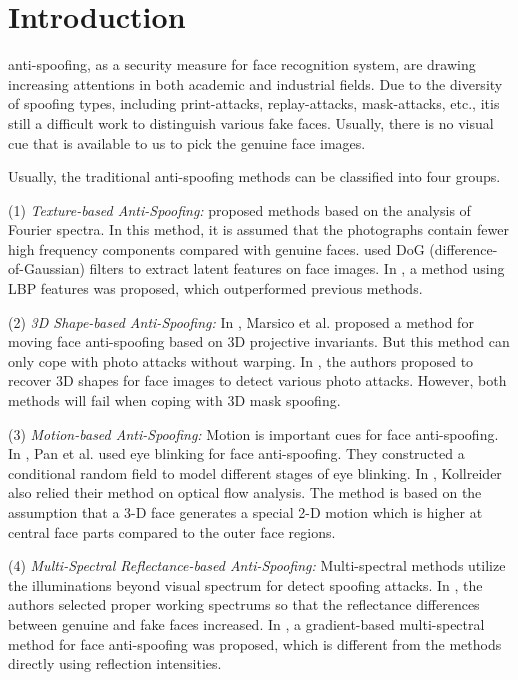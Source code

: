 \documentclass[journal]{IEEEtran}
\begin{document}
\section{Introduction}

 anti-spoofing, as a security measure for face recognition system, are drawing increasing attentions in both academic and industrial fields. Due to the diversity of spoofing types, including print-attacks, replay-attacks, mask-attacks, etc., itis still a difficult work to distinguish various fake faces. Usually, there is no visual cue that is available to us to pick the genuine face images.

Usually, the traditional anti-spoofing methods can be classified into four groups. 

(1) \emph{Texture-based Anti-Spoofing:} \cite{li2004live} proposed methods based on the analysis of Fourier spectra. In this method, it is assumed that the photographs contain fewer high frequency components compared with genuine faces. \cite{tan2010face} used DoG (difference-of-Gaussian) filters to extract latent features on face images. In \cite{chingovska2012effectiveness}, a method using LBP features was proposed, which outperformed previous methods. 

(2) \emph{3D Shape-based Anti-Spoofing:} In \cite{de2012moving}, Marsico et al. proposed a method for moving face anti-spoofing based on 3D projective invariants. But this method can only cope with photo attacks without warping. In \cite{wang2013face}, the authors proposed to recover 3D shapes for face images to detect various photo attacks. However, both methods will fail when coping with 3D mask spoofing.

(3) \emph{Motion-based Anti-Spoofing:} Motion is important cues for face anti-spoofing. In \cite{pan2007eyeblink}, Pan et al. used eye blinking for face anti-spoofing. They constructed a conditional random field to model different stages of eye blinking. In \cite{kollreider2005evaluating}, Kollreider also relied their method on optical flow analysis. The method is based on the assumption that a 3-D face generates a special 2-D motion which is higher at central face parts compared to the outer face regions.

(4) \emph{Multi-Spectral Reflectance-based Anti-Spoofing:} Multi-spectral methods utilize the illuminations beyond visual spectrum for detect spoofing attacks. In \cite{pavlidis2000imaging}, the authors selected proper working spectrums so that the reflectance differences between genuine and fake faces increased. In \cite{hou2013multispectral}, a gradient-based multi-spectral method for face anti-spoofing was proposed, which is different from the methods directly using reflection intensities.
\end{document}
